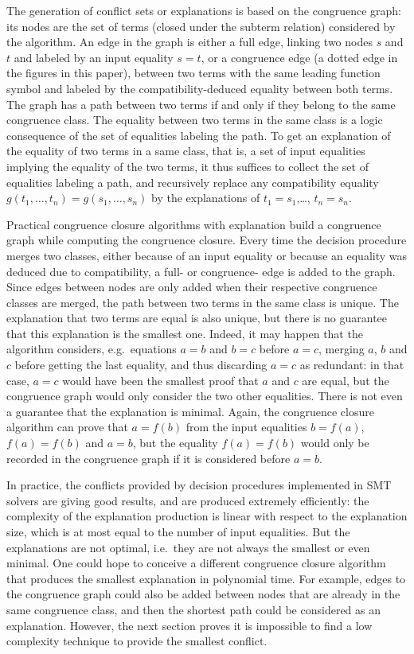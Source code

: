 \documentclass[smallextended]{svjour3}
\begin{document}
The generation of conflict sets or explanations is based on the congruence
graph: its nodes are the set of terms (closed under the subterm relation)
considered by the algorithm.  An edge in the graph is either a full edge,
linking two nodes $s$ and $t$ and labeled by an input equality $s=t$, or a
congruence edge (a dotted edge in the figures in this paper), between two terms
with the same leading function symbol and labeled by the compatibility-deduced equality
between both terms.  The graph has a path between two terms if and only if they
belong to the same congruence class.  The equality between two terms in the same
class is a logic consequence of the set of equalities labeling the path.  To get
an explanation of the equality of two terms in a same class, that is, a set of
input equalities implying the equality of the two terms, it thus suffices to
collect the set of equalities labeling a path, and recursively replace any
compatibility equality $g(t_1,\ldots,t_n) = g(s_1,\ldots,s_n)$ by the
explanations of $t_1=s_1$,\dots, $t_n=s_n$.

Practical congruence closure algorithms with explanation build a congruence
graph while computing the congruence closure.  Every time the decision procedure
merges two classes, either because of an input equality or because an equality was deduced due to compatibility,
a full- or congruence- edge is added to the graph.  
Since edges between nodes are only added when their respective congruence classes are merged, 
the path between two terms in the same class is unique.  The
explanation that two terms are equal is also unique, but there is no guarantee
that this explanation is the smallest one.  Indeed, it may happen that the
algorithm considers, e.g.\ equations $a=b$ and $b=c$ before $a=c$, merging $a$,
$b$ and $c$ before getting the last equality, and thus discarding $a=c$ as
redundant: in that case, $a=c$ would have been the smallest proof that $a$ and
$c$ are equal, but the congruence graph would only consider the two other
equalities. 
There is not even a guarantee that the explanation is minimal.
Again, the congruence closure algorithm can prove that $a = f(b)$ from the input
equalities $b = f(a)$, $f(a) = f(b)$ and $a = b$, but the equality $f(a) = f(b)$
would only be recorded in the congruence graph if it is considered before $a = b$.

In practice, the conflicts provided by decision procedures implemented in SMT
solvers are giving good results, and are produced extremely efficiently: the
complexity of the explanation production is linear with respect to the
explanation size, which is at most equal to the number of input equalities.  But
the explanations are not optimal, i.e.\ they are not always the smallest or even
minimal. 
One could hope to conceive a different congruence closure algorithm that produces 
the smallest explanation in polynomial time.
For example, edges to the congruence graph could also be added between nodes that are already in the same congruence class, 
and then the shortest path could be considered as an explanation.
However, the next section proves it is impossible to find a low complexity
technique to provide the smallest conflict.
\end{document}
